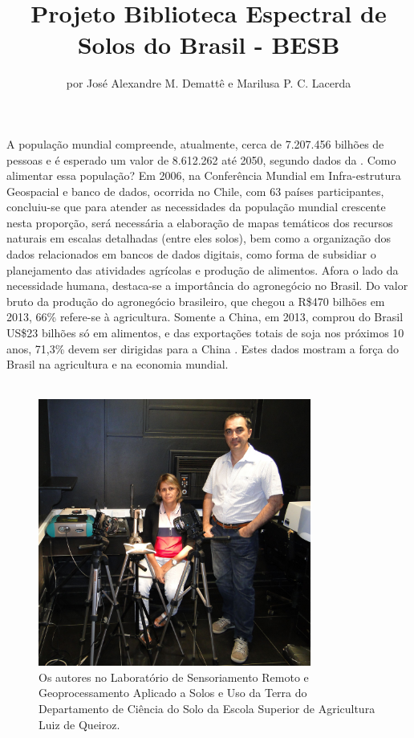 \title{Projeto Biblioteca Espectral de Solos do Brasil - BESB}
\author{por José Alexandre M. Demattê e Marilusa P. C. Lacerda}
\maketitle

A população mundial compreende, atualmente, cerca de 7.207.456 bilhões de pessoas e é esperado um valor de 8.612.262 até 2050, segundo dados da \citet{FAO:2013}. Como alimentar essa população? Em 2006, na Conferência Mundial em Infra-estrutura Geospacial e banco de dados, ocorrida no Chile, com 63 países participantes, concluiu-se que para atender as necessidades da população mundial crescente nesta proporção, será necessária a elaboração de mapas temáticos dos recursos naturais em escalas detalhadas (entre eles solos), bem como a organização dos dados relacionados em bancos de dados digitais, como forma de subsidiar o planejamento das atividades agrícolas e produção de alimentos. Afora o lado da necessidade humana, destaca-se a importância do agronegócio no Brasil. Do valor bruto da produção do agronegócio brasileiro, que chegou a R\$470 bilhões em 2013, 66\% refere-se à agricultura. Somente a China, em 2013, comprou do Brasil US\$23 bilhões só em alimentos, e das exportações totais de soja nos próximos 10 anos, 71,3\% devem ser dirigidas para a China \citep{Brasil:2013}. Estes dados mostram a força do Brasil na agricultura e na economia mundial.\\
\\
\begin{figure}[htbp]
   \centering
   \includegraphics[width=0.8\textwidth]{figuras/dematte-marilusa.jpg}
   \caption{Os autores no Laboratório de Sensoriamento Remoto e Geoprocessamento Aplicado a Solos e Uso da Terra do Departamento de Ciência do Solo da Escola Superior de Agricultura Luiz de Queiroz.}
   \label{fig:autores}
\end{figure}

